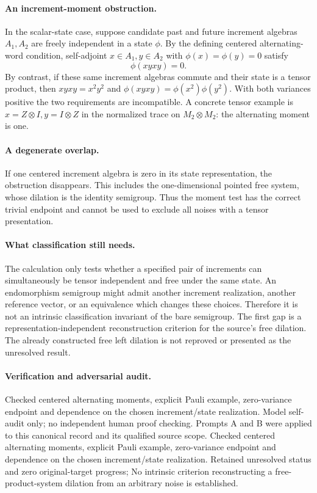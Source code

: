\documentclass[11pt]{article}
\begin{document}
\paragraph{An increment-moment obstruction.} In the scalar-state case, suppose candidate past and future increment algebras $A_1,A_2$ are freely independent in a state $\phi$. By the defining centered alternating-word condition, self-adjoint $x\in A_1,y\in A_2$ with $\phi(x)=\phi(y)=0$ satisfy
\[
 \phi(xyxy)=0.
\]
By contrast, if these same increment algebras commute and their state is a tensor product, then $xyxy=x^2y^2$ and $\phi(xyxy)=\phi(x^2)\phi(y^2)$. With both variances positive the two requirements are incompatible. A concrete tensor example is $x=Z\otimes I,y=I\otimes Z$ in the normalized trace on $M_2\otimes M_2$: the alternating moment is one.

\paragraph{A degenerate overlap.} If one centered increment algebra is zero in its state representation, the obstruction disappears. This includes the one-dimensional pointed free system, whose dilation is the identity semigroup. Thus the moment test has the correct trivial endpoint and cannot be used to exclude all noises with a tensor presentation.

\paragraph{What classification still needs.} The calculation only tests whether a specified pair of increments can simultaneously be tensor independent and free under the same state. An endomorphism semigroup might admit another increment realization, another reference vector, or an equivalence which changes these choices. Therefore it is not an intrinsic classification invariant of the bare semigroup. The first gap is a representation-independent reconstruction criterion for the source's free dilation. The already constructed free left dilation is not reproved or presented as the unresolved result.

\paragraph{Verification and adversarial audit.}
Checked centered alternating moments, explicit Pauli example, zero-variance endpoint and dependence on the chosen increment/state realization. Model self-audit only; no independent human proof checking. Prompts A and B were applied to this canonical record and its qualified source scope. Checked centered alternating moments, explicit Pauli example, zero-variance endpoint and dependence on the chosen increment/state realization. Retained unresolved status and zero original-target progress; No intrinsic criterion reconstructing a free-product-system dilation from an arbitrary noise is established.
\end{document}
